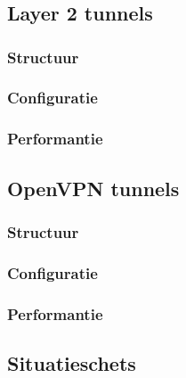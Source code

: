 \chapter{}%
\label{ch:tunnel-technologieën}

\section{Layer 2 tunnels}
\label{sec:layer2}

\subsection{Structuur}

\subsection{Configuratie}

\subsection{Performantie}

\section{OpenVPN tunnels}
\label{sec:openvpn}

\subsection{Structuur}

\subsection{Configuratie}

\subsection{Performantie}

\section{Situatieschets}
\label{sec:situatieschets}
